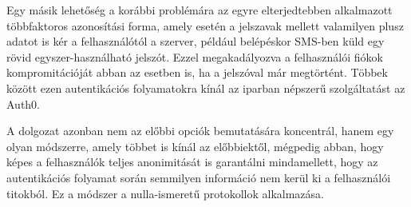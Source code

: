 Egy másik lehetőség a korábbi problémára az egyre elterjedtebben alkalmazott többfaktoros azonosítási forma, amely esetén a jelszavak mellett valamilyen plusz adatot is kér a felhasználótól a szerver, például belépéskor SMS-ben küld egy rövid egyszer-használható jelszót. Ezzel megakadályozva a felhasználói fiókok kompromitációját abban az esetben is, ha a jelszóval már megtörtént. Többek között ezen autentikációs folyamatokra kínál az iparban népszerű szolgáltatást az Auth0.

A dolgozat azonban nem az előbbi opciók bemutatására koncentrál, hanem egy olyan módszerre, amely többet is kínál az előbbiektől, mégpedig abban, hogy képes a felhasználók teljes anonimitását is garantálni mindamellett, hogy az autentikációs folyamat során semmilyen információ nem kerül ki a felhasználói titokból. Ez a módszer a nulla-ismeretű protokollok alkalmazása.